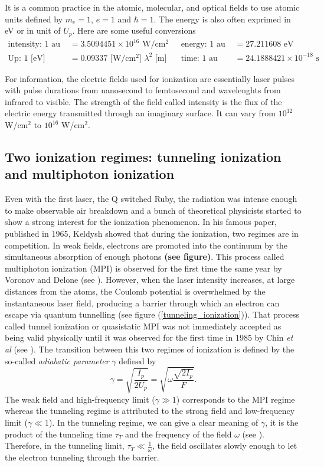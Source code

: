 \documentclass[a4paper]{article}
\begin{document}
It is a common practice in the atomic, molecular, and optical fields to use atomic units defined by $m_{e}=1$, $e=1$ and $\hbar=1$. The energy is also often exprimed in eV or in unit of $U_{p}$. Here are some useful conversions
\begin{align*}
\text{intensity: } 1 \text{ au } & = 3.5094451\times10^{16} \text{ W/cm$^{2}$ }  &\text{energy: } 1 \text{ au }&= 27.211608 \text{ eV} \\
\text{Up: } 1\text{ [eV]} &= 0.09337 \text{ [W/cm$^{2}$] }\lambda^{2}\text{ [m] } &\text{time: } 1 \text{ au }&=24.1888421\times10^{-18} \text{ s} 
\end{align*}

For information, the electric fields used for ionization are essentially laser pulses with pulse durations from nanosecond to femtosecond and wavelenghts from infrared to visible.
The strength of the field called intensity is the flux of the electric energy transmitted through an imaginary surface. It can vary from $10^{12}$ W/cm$^{2}$ to $10^{16}$ W/cm$^{2}$.
 

\subsection{Two ionization regimes: tunneling ionization and multiphoton ionization}
Even with the first laser, the Q switched Ruby, the radiation was intense enough to make observable air breakdown and a bunch of theoretical physicists started to show a strong interest for the ionization phenomenon. In his famous paper, published in 1965, Keldysh showed that during the ionization, two regimes are in competition. In weak fields, electrons are promoted into the continuum by the simultaneous absorption of enough photons \textbf{(see figure)}. This process called multiphoton ionization (MPI) is observed for the first time the same year by Voronov and Delone (see \cite{Voronov_1966}). However, when the laser intensity increases, at large distances from the atoms, the Coulomb potential is overwhelmed by the instantaneous laser field, producing a barrier through which an electron can escape via quantum tunnelling (see figure (\ref{tunneling_ionization})). That process called tunnel ionization or quasistatic MPI was not immediately accepted as being valid physically until it was observed for the first time in 1985 by Chin \textit{et al} (see \cite{Chin_1985}). The transition between this two regimes of ionization is defined by the so-called \textit{adiabatic parameter} $\gamma$ defined by
\begin{equation}
\gamma=\sqrt{\frac{I_{p}}{2U_{p}}} = \sqrt{\omega\frac{\sqrt{2I_{p}}}{F}}.
\end{equation}
The weak field and high-frequency limit ($\gamma \gg 1$) corresponds to the MPI regime whereas the tunneling regime is attributed to the strong field and low-frequency limit ($\gamma \ll 1$). In the tunneling regime, we can give a clear meaning of $\gamma$, it is the product of the tunneling time $\tau_{T}$ and the frequency of the field $\omega$ (see \cite{Misha_2014}). Therefore, in the tunneling limit, $\tau_{T} \ll \frac{1}{\omega}$, the field oscillates slowly enough to let the electron tunneling through the barrier. 
\end{document}
